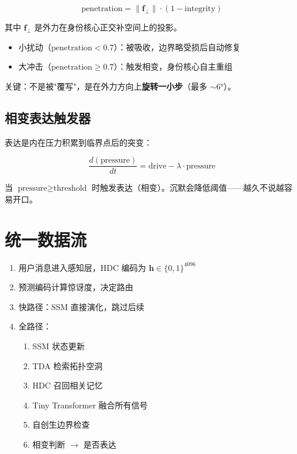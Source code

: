 \documentclass[11pt,a4paper]{article}
\begin{document}
\[
\text{penetration} = \|\mathbf{f}_\perp\| \cdot (1 - \text{integrity})
\]

其中 $\mathbf{f}_\perp$ 是外力在身份核心正交补空间上的投影。

\begin{itemize}[nosep]
  \item 小扰动（$\text{penetration} < 0.7$）：被吸收，边界略受损后自动修复
  \item 大冲击（$\text{penetration} \geq 0.7$）：触发相变，身份核心自主重组
\end{itemize}

关键：不是被"覆写"，是在外力方向上\textbf{旋转一小步}（最多 $\sim 6°$）。

\subsection{相变表达触发器}

表达是内在压力积累到临界点后的突变：

\[
\frac{d(\text{pressure})}{dt} = \text{drive} - \lambda \cdot \text{pressure}
\]

当 $\text{pressure} \geq \text{threshold}$ 时触发表达（相变）。沉默会降低阈值——越久不说越容易开口。

\section{统一数据流}

\begin{enumerate}[nosep]
  \item 用户消息进入感知层，HDC 编码为 $\mathbf{h} \in \{0,1\}^{4096}$
  \item 预测编码计算惊讶度，决定路由
  \item 快路径：SSM 直接演化，跳过后续
  \item 全路径：
    \begin{enumerate}[nosep]
      \item SSM 状态更新
      \item TDA 检索拓扑空洞
      \item HDC 召回相关记忆
      \item Tiny Transformer 融合所有信号
      \item 自创生边界检查
      \item 相变判断 $\to$ 是否表达
    \end{enumerate}
\end{enumerate}
\end{document}

